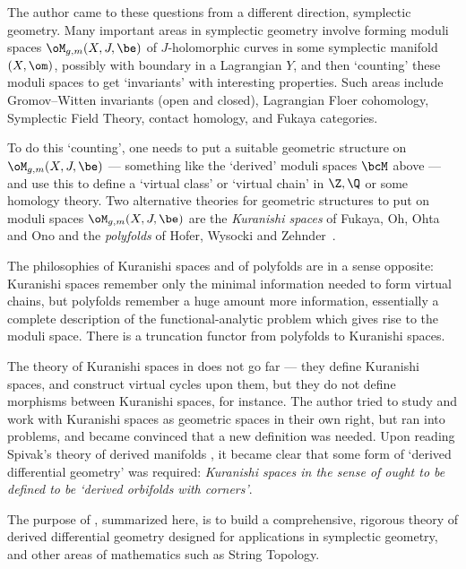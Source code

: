 \documentclass{article}
\begin{document}
The author came to these questions from a different direction,
symplectic geometry. Many important areas in symplectic
geometry involve forming moduli spaces
$\oM_{g,m}(X,J,\be)$ of $J$-holomorphic curves in some symplectic
manifold $(X,\om)$, possibly with boundary in a Lagrangian
$Y$, and then `counting' these moduli
spaces to get `invariants' with interesting properties. Such areas
include Gromov--Witten invariants (open
and closed), Lagrangian Floer cohomology, Symplectic Field Theory,
contact homology, and Fukaya
categories.

To do this `counting', one needs to put a suitable geometric
structure on $\oM_{g,m}(X,J,\be)$ --- something like the `derived'
moduli spaces $\bcM$ above --- and use this to define a `virtual
class' or `virtual chain' in $\Z,\Q$ or some
homology theory. Two alternative theories for geometric structures
to put on moduli spaces $\oM_{g,m}(X,J,\be)$ are the {\it Kuranishi
spaces\/} of Fukaya, Oh, Ohta and Ono
\cite{FuOn,FOOO} and the {\it polyfolds\/} of Hofer,
Wysocki and Zehnder~\cite{HWZ1,HWZ2,HWZ3,HWZ4,HWZ5,HWZ6}.

The philosophies of Kuranishi spaces and of polyfolds are in a sense
opposite: Kuranishi spaces remember only the minimal information
needed to form virtual chains, but polyfolds remember a huge amount
more information, essentially a complete description of the
functional-analytic problem which gives rise to the moduli space.
There is a truncation functor from polyfolds to Kuranishi spaces.

The theory of Kuranishi spaces in \cite{FuOn,FOOO} does not go far
--- they define Kuranishi spaces, and construct virtual cycles upon
them, but they do not define morphisms between Kuranishi spaces, for
instance. The author tried to study and work with Kuranishi spaces
as geometric spaces in their own right, but ran into problems, and
became convinced that a new definition was needed. Upon reading
Spivak's theory of derived manifolds \cite{Spiv}, it became clear that some form of `derived differential
geometry' was required: {\it Kuranishi spaces in the sense of\/
{\rm\cite[\S A]{FOOO}} ought to be defined to be `derived orbifolds
with corners'}.

The purpose of \cite{Joyc6}, summarized here, is to build a
comprehensive, rigorous theory of derived differential geometry
designed for applications in symplectic geometry, and other areas of
mathematics such as String Topology.
\end{document}
